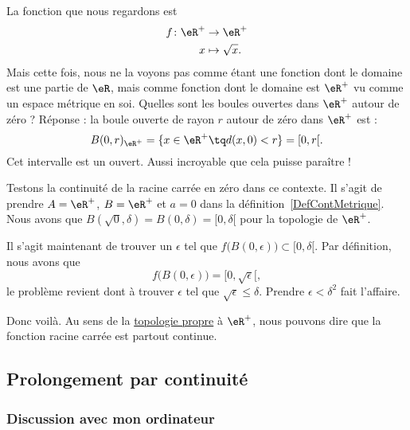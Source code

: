 La fonction que nous regardons est
\begin{equation}
\begin{aligned}
f \colon \eR^+&\to \eR^+ \\
   x&\mapsto \sqrt{x}.
\end{aligned}
\end{equation}
Mais cette fois, nous ne la voyons pas comme étant une fonction dont le domaine est une partie de $\eR$, mais comme fonction dont le domaine est $\eR^+$ vu comme un espace métrique en soi. Quelles sont les boules ouvertes dans $\eR^+$ autour de zéro ? Réponse : la boule ouverte de rayon $r$ autour de zéro dans $\eR^+$ est :
\[
  B(0,r)_{\eR^+}=\{ x\in\eR^+\tq d(x,0)<r \}=[0,r[.
\]
Cet intervalle est un ouvert. Aussi incroyable que cela puisse paraître !

Testons la continuité de la racine carrée en zéro dans ce contexte. Il s'agit de prendre $A=\eR^+$, $B=\eR^+$ et $a=0$ dans la définition~\ref{DefContMetrique}. Nous avons que $B(\sqrt{0},\delta)=B(0,\delta)=[0,\delta[$ pour la topologie de $\eR^+$.

Il s'agit maintenant de trouver un $\epsilon$ tel que $f\big( B(0,\epsilon) \big)\subset [0,\delta[$. Par définition, nous avons que
\[
  f\big( B(0,\epsilon) \big)=[0,\sqrt{\epsilon}[,
\]
le problème revient dont à trouver $\epsilon$ tel que $\sqrt{\epsilon}\leq\delta$. Prendre $\epsilon<\delta^2$ fait l'affaire.


Donc voilà. Au sens de la \href{http://fr.wikipedia.org/wiki/Topologie_induite}{topologie propre} à $\eR^+$, nous pouvons dire que la fonction racine carrée est partout continue.

\subsection{Prolongement par continuité}

\subsubsection{Discussion avec mon ordinateur}

